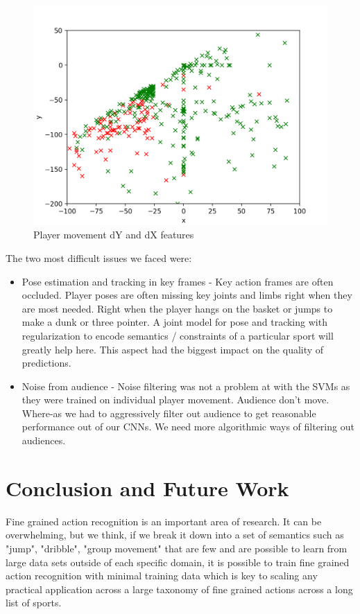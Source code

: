 \documentclass{article}
\begin{document}
\begin{figure}[ht]
\vskip 0.05in
\begin{center}
\centerline{\includegraphics[width=\columnwidth]{xy_travel.png}}
\caption{Player movement dY and dX features}
\label{fig:classes}
\end{center}
\vskip -0.3in
\end{figure}

The two most difficult issues we faced were:
\begin{itemize}
\item Pose estimation and tracking in key frames - Key action frames are often occluded. Player poses are often missing key joints and limbs right when they are most needed. Right when the player hangs on the basket or jumps to make a dunk or three pointer. A joint model for pose and tracking with regularization to encode semantics / constraints of a particular sport will greatly help here. This aspect had the biggest impact on the quality of predictions.
\item Noise from audience - Noise filtering was not a problem at with the SVMs as they were trained on individual player movement. Audience don't move. Where-as we had to aggressively filter out audience to get reasonable performance out of our CNNs. We need more algorithmic ways of filtering out audiences.
\end{itemize}



\section{Conclusion and Future Work}
\label{conclusion}
Fine grained action recognition is an important area of research. It can be overwhelming, but we think, if we break it down into a set of semantics such as "jump", "dribble", "group movement" that are few and are possible to learn from large data sets outside of each specific domain, it is possible to train fine grained action recognition with minimal training data which is key to scaling any practical application across a large taxonomy of fine grained actions across a long list of sports. 
\end{document}

